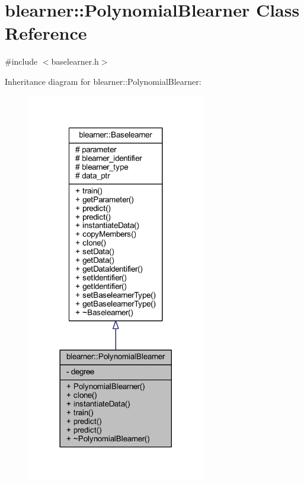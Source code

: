 \hypertarget{classblearner_1_1_polynomial_blearner}{}\section{blearner\+:\+:Polynomial\+Blearner Class Reference}
\label{classblearner_1_1_polynomial_blearner}


{\ttfamily \#include $<$baselearner.\+h$>$}



Inheritance diagram for blearner\+:\+:Polynomial\+Blearner\+:
\nopagebreak
\begin{figure}[H]
\begin{center}
\leavevmode
\includegraphics[width=221pt]{classblearner_1_1_polynomial_blearner__inherit__graph}
\end{center}
\end{figure}


